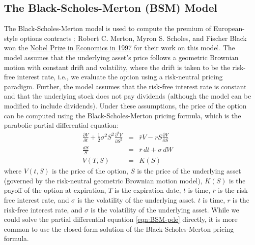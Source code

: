 \documentclass[11pt]{article}
\theoremstyle{definition}
\begin{document}
\subsection*{The Black-Scholes-Merton (BSM) Model}
The Black-Scholes-Merton model is used to compute the premium of European-style options contracts \cite{BlackScholes1973};
Robert C. Merton, Myron S. Scholes, and Fischer Black won the \href{https://www.nobelprize.org/prizes/economic-sciences/1997/press-release/}{Nobel Prize in Economics in 1997} for their work on this model.
The model assumes that the underlying asset's price follows a geometric Brownian motion with constant drift and volatility, where the drift is taken to be the risk-free interest rate, i.e., we evaluate the option using a risk-neutral pricing paradigm.
Further, the model assumes that the risk-free interest rate is constant and that the underlying stock does not pay dividends (although the model can be modified to include dividends).
Under these assumptions, the price of the option can be computed using the Black-Scholes-Merton pricing formula, which is the parabolic partial differential equation:
\begin{eqnarray}\label{eqn:BSM-pde}
	\frac{\partial{V}}{\partial{t}} + \frac{1}{2}\sigma^{2}S^{2}\frac{\partial^{2}V}{\partial{S}^{2}} & = & \bar{r}V - rS\frac{\partial{V}}{\partial{S}}  \\
	\frac{dS}{S} & = & \bar{r}\,dt + \sigma\,{dW}\\
	V(T,S) & = & K(S)
\end{eqnarray}
where $V(t, S)$ is the price of the option, $S$ is the price of the underlying asset (governed by the risk-neutral geometric Brownian motion model), 
$K(S)$ is the payoff of the option at expiration, $T$ is the expiration date, $t$ is time, 
$\bar{r}$ is the risk-free interest rate, and $\sigma$ is the volatility of the underlying asset.
$t$ is time, $r$ is the risk-free interest rate, and $\sigma$ is the volatility of the underlying asset.
While we could solve the partial differential equation \ref{eqn:BSM-pde} directly, it is more common to use the closed-form solution of the Black-Scholes-Merton pricing formula.
\end{document}
